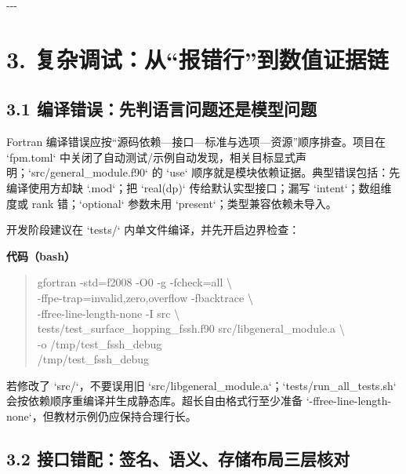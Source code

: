 \documentclass[UTF8,openany,11pt,fontset=fandol]{ctexbook}
\begin{document}
-\/-\/-

\section{\texorpdfstring{\textbf{3.
复杂调试：从``报错行''到数值证据链}}{3. 复杂调试：从``报错行''到数值证据链}}\label{ux590dux6742ux8c03ux8bd5ux4eceux62a5ux9519ux884cux5230ux6570ux503cux8bc1ux636eux94fe}

\subsection{\texorpdfstring{\textbf{3.1
编译错误：先判语言问题还是模型问题}}{3.1 编译错误：先判语言问题还是模型问题}}\label{ux7f16ux8bd1ux9519ux8befux5148ux5224ux8bedux8a00ux95eeux9898ux8fd8ux662fux6a21ux578bux95eeux9898}

Fortran
编译错误应按``源码依赖---接口---标准与选项---资源''顺序排查。项目在
`fpm.toml`
中关闭了自动测试/示例自动发现，相关目标显式声明；`src/general\_module.f90`
的 `use` 顺序就是模块依赖证据。典型错误包括：先编译使用方却缺 `.mod`；把
`real(dp)` 传给默认实型接口；漏写 `intent`；数组维度或 rank
错；`optional` 参数未用 `present`；类型兼容依赖未导入。

开发阶段建议在 `tests/` 内单文件编译，并先开启边界检查：

\textbf{代码（bash）}

\begin{quote}
gfortran -std=f2008 -O0 -g -fcheck=all \textbackslash{}\\
-ffpe-trap=invalid,zero,overflow -fbacktrace \textbackslash{}\\
-ffree-line-length-none -I src \textbackslash{}\\
tests/test\_surface\_hopping\_fssh.f90 src/libgeneral\_module.a
\textbackslash{}\\
-o /tmp/test\_fssh\_debug\\
/tmp/test\_fssh\_debug
\end{quote}

若修改了 `src/`，不要误用旧
`src/libgeneral\_module.a`；`tests/run\_all\_tests.sh`
会按依赖顺序重编译并生成静态库。超长自由格式行至少准备
`-ffree-line-length-none`，但教材示例仍应保持合理行长。

\subsection{\texorpdfstring{\textbf{3.2
接口错配：签名、语义、存储布局三层核对}}{3.2 接口错配：签名、语义、存储布局三层核对}}\label{ux63a5ux53e3ux9519ux914dux7b7eux540dux8bedux4e49ux5b58ux50a8ux5e03ux5c40ux4e09ux5c42ux6838ux5bf9}
\end{document}
